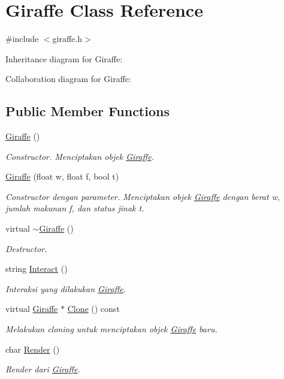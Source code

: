 \hypertarget{classGiraffe}{}\section{Giraffe Class Reference}
\label{classGiraffe}


{\ttfamily \#include $<$giraffe.\+h$>$}



Inheritance diagram for Giraffe\+:


Collaboration diagram for Giraffe\+:
\subsection*{Public Member Functions}
\begin{DoxyCompactItemize}
\item 
\hyperlink{classGiraffe_a4a396bd3e634243c1740916b71197168}{Giraffe} ()
\begin{DoxyCompactList}\small\item\em Constructor. Menciptakan objek \hyperlink{classGiraffe}{Giraffe}. \end{DoxyCompactList}\item 
\hyperlink{classGiraffe_aa04be26d10955712062e0c0dbf8e6d8f}{Giraffe} (float w, float f, bool t)
\begin{DoxyCompactList}\small\item\em Constructor dengan parameter. Menciptakan objek \hyperlink{classGiraffe}{Giraffe} dengan berat w, jumlah makanan f, dan status jinak t. \end{DoxyCompactList}\item 
virtual \hyperlink{classGiraffe_a1d099c4a2c87fbac26e5bcb33084dcb4}{$\sim$\+Giraffe} ()
\begin{DoxyCompactList}\small\item\em Destructor. \end{DoxyCompactList}\item 
string \hyperlink{classGiraffe_ad73e5ee5fc62f709c52a1cab68f2a1f3}{Interact} ()
\begin{DoxyCompactList}\small\item\em Interaksi yang dilakukan \hyperlink{classGiraffe}{Giraffe}. \end{DoxyCompactList}\item 
virtual \hyperlink{classGiraffe}{Giraffe} $\ast$ \hyperlink{classGiraffe_aa29f8f77477a64fc72f814b7f225c94f}{Clone} () const 
\begin{DoxyCompactList}\small\item\em Melakukan cloning untuk menciptakan objek \hyperlink{classGiraffe}{Giraffe} baru. \end{DoxyCompactList}\item 
char \hyperlink{classGiraffe_a64dccf030fdb54de9fd37f8381c64271}{Render} ()
\begin{DoxyCompactList}\small\item\em Render dari \hyperlink{classGiraffe}{Giraffe}. \end{DoxyCompactList}\end{DoxyCompactItemize}
